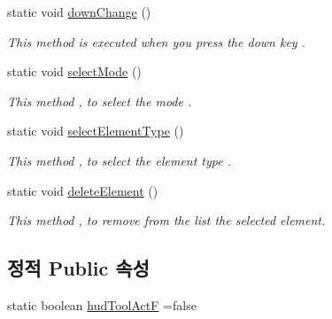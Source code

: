 \begin{DoxyCompactItemize}
static void \hyperlink{classkr_1_1ac_1_1kookmin_1_1cs_1_1tool_1_1_hud_layout_tool_a4bca914c51cd37d73bd17e62835f4349}{down\+Change} ()
\begin{DoxyCompactList}\small\item\em This method is executed when you press the down key . \end{DoxyCompactList}\item 
static void \hyperlink{classkr_1_1ac_1_1kookmin_1_1cs_1_1tool_1_1_hud_layout_tool_aed1bf1517f60598e90f982d837fbb4b1}{select\+Mode} ()
\begin{DoxyCompactList}\small\item\em This method , to select the mode . \end{DoxyCompactList}\item 
static void \hyperlink{classkr_1_1ac_1_1kookmin_1_1cs_1_1tool_1_1_hud_layout_tool_a8088ea305a4ba9df53b6bad090655e36}{select\+Element\+Type} ()
\begin{DoxyCompactList}\small\item\em This method , to select the element type . \end{DoxyCompactList}\item 
static void \hyperlink{classkr_1_1ac_1_1kookmin_1_1cs_1_1tool_1_1_hud_layout_tool_a05ef186ad6a81c750d3d27fa3cd96263}{delete\+Element} ()
\begin{DoxyCompactList}\small\item\em This method , to remove from the list the selected element. \end{DoxyCompactList}\end{DoxyCompactItemize}
\subsection*{정적 Public 속성}
\begin{DoxyCompactItemize}
\item 
static boolean \hyperlink{classkr_1_1ac_1_1kookmin_1_1cs_1_1tool_1_1_hud_layout_tool_a48bdb0935f0a1b47acdd97d4ea4adab6}{hud\+Tool\+Act\+F} =false
\end{DoxyCompactItemize}
